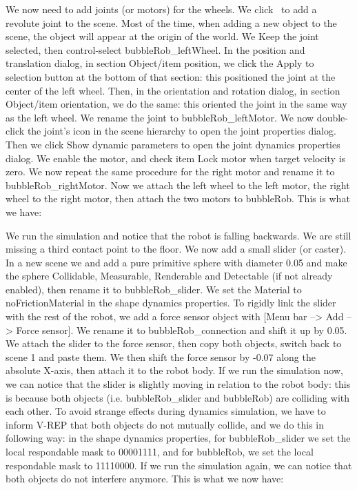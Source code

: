 We now need to add joints (or motors) for the wheels. We click
\ to add a revolute joint to the scene. Most
of the time, when adding a new object to the scene, the object will appear 
at the origin of the world. We Keep the joint selected, then control-select
bubbleRob\_leftWheel. In the position and translation dialog, in section
Object/item position, we click the Apply to selection button at the bottom 
of that section: this positioned the joint at the center of the left wheel.
Then, in the orientation and rotation dialog, in section Object/item 
orientation, we do the same: this oriented the joint in the same way as the
left wheel. We rename the joint to bubbleRob\_leftMotor. We now double-click
the joint's icon in the scene hierarchy to open the joint properties dialog.
Then we click Show dynamic parameters to open the joint dynamics properties
dialog. We enable the motor, and check item Lock motor when target velocity
is zero. We now repeat the same procedure for the right motor and rename it
to bubbleRob\_rightMotor. Now we attach the left wheel to the left motor, the
right wheel to the right motor, then attach the two motors to bubbleRob.
This is what we have:


We run the simulation and notice that the robot is falling backwards. We are 
still missing a third contact point to the floor. We now add a small slider
(or caster). In a new scene we and add a pure primitive sphere with diameter
0.05 and make the sphere Collidable, Measurable, Renderable and Detectable
(if not already enabled), then rename it to bubbleRob\_slider. We set the
Material to noFrictionMaterial in the shape dynamics properties. To rigidly
link the slider with the rest of the robot, we add a force sensor object 
with [Menu bar --> Add --> Force sensor]. We rename it to 
bubbleRob\_connection and shift it up by 0.05. We attach the slider to the
force sensor, then copy both objects, switch back to scene 1 and paste them.
We then shift the force sensor by -0.07 along the absolute X-axis, then
attach it to the robot body. If we run the simulation now, we can notice 
that the slider is slightly moving in relation to the robot body: this is 
because both objects (i.e. bubbleRob\_slider and bubbleRob) are colliding 
with each other. To avoid strange effects during dynamics simulation, we
have to inform V-REP that both objects do not mutually collide, and we do
this in following way: in the shape dynamics properties, for bubbleRob\_slider
we set the local respondable mask to 00001111, and for bubbleRob, we set the
local respondable mask to 11110000. If we run the simulation again, we can
notice that both objects do not interfere anymore. This is what we now have:

